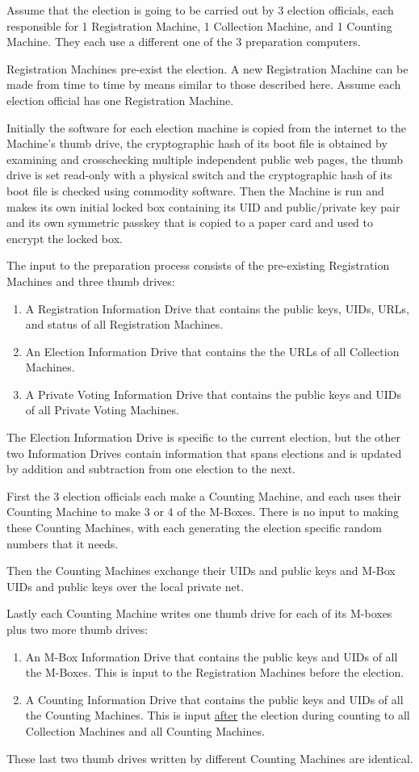\documentclass[12pt]{article}
\begin{document}
Assume that the election is going to be carried out by 3 election
officials, each responsible for 1 Registration Machine, 1 Collection
Machine, and 1 Counting Machine.  They each use a different one of
the 3 preparation computers.

Registration Machines pre-exist the election.
A new Registration Machine can be made from time to time
by means similar to those described here.  Assume each election
official has one Registration Machine.

Initially the software for each election machine
is copied from the internet to the Machine's thumb drive,
the cryptographic hash of its boot file is obtained by examining
and crosschecking multiple independent public web pages, the thumb
drive is set read-only with a physical switch and the cryptographic
hash of its boot file is checked using commodity software.
Then the Machine is run and makes its own initial locked box
containing its UID and public/private key pair and its own
symmetric passkey that is copied to a paper card and used to
encrypt the locked box.

The input to the preparation process consists of the pre-existing
Registration Machines and three thumb drives:
\begin{enumerate}
\item A Registration Information Drive that contains the
public keys, UIDs, URLs, and status of all Registration
Machines.
\item An Election Information Drive that contains the
the URLs of all Collection Machines.
\item A Private Voting Information Drive that contains the
public keys and UIDs of all Private Voting Machines.
\end{enumerate}
The Election Information Drive is specific to the current election,
but the other two Information Drives contain information that
spans elections and is updated by addition and subtraction
from one election to the next.

First the 3 election officials each make a Counting Machine, and
each uses their Counting Machine to make 3 or 4 of the M-Boxes.  There
is no input to making these Counting Machines, with
each generating the election specific random numbers that it needs.

Then the Counting Machines exchange their UIDs and public keys and M-Box
UIDs and public keys over the local private net.

Lastly each Counting Machine
writes one thumb drive for each of its M-boxes plus two more thumb drives:
\begin{enumerate}
\item An M-Box Information Drive that contains the public keys and
UIDs of all the M-Boxes.  This is input to the Registration Machines
before the election.
\item A Counting Information Drive that contains the public keys and
UIDs of all the Counting Machines.
This is input \underline{after} the election during
counting to all Collection Machines and all Counting Machines.
\end{enumerate}
These last two thumb drives written by different Counting Machines
are identical.
\end{document}
